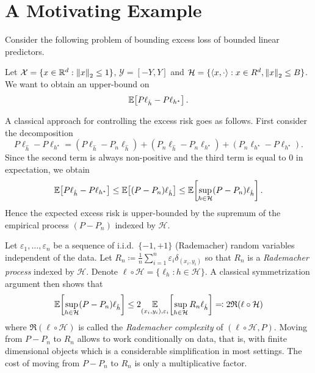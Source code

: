\documentclass[main.tex]{subfiles}
\begin{document}
\section{A Motivating Example}
\label{section:motivation}

Consider the following problem of bounding excess loss of bounded linear
predictors.
\begin{problem}
  \label{problem:linear-predictors}
  Let $\mathcal{X} = \{x \in \mathbb{R}^{d} : \left\lVert x \right\rVert_{2} \leq 1\}$,
  $\mathcal{Y} = [-Y, Y]$ and
  $\mathcal{H} = \{\left\langle {x}, {\cdot} \right\rangle : x \in R^{d}, \left\lVert x \right\rVert_{2} \leq B\}$.
  We want to obtain an upper-bound on
  $$
    \mathbb{E}\!\left[{
      P\ell_{\hat{h}} - P\ell_{h^{\star}}
    }\right].
  $$
\end{problem}

A classical approach for controlling the excess risk goes as follows.
First consider the decomposition
\begin{equation}
  P\ell_{\hat{h}} - P\ell_{h^{\star}}
  =
  (P\ell_{\hat{h}}
  - P_{n}\ell_{\hat{h}})
  + (P_{n}{\ell_{\hat{h}}}
  - P_{n}{\ell_{h^{\star}}})
  + (P_{n}{\ell_{h^{\star}}}
  - P\ell_{h^{\star}}).
  \label{eq:excess-risk-decomposition}
\end{equation}
Since the second term is always non-positive and the third term is equal to
$0$ in expectation, we obtain
$$
  \mathbb{E}\!\left[{P\ell_{\hat{h}} - P\ell_{h^{\star}}}\right]
  \leq
  \mathbb{E}\!\left[{(P-P_{n})\ell_{\hat{h}}}\right]
  \leq
  \mathbb{E}\!\left[{\sup_{h \in \mathcal{H}} (P-P_{n})\ell_{\hat{h}}}\right].
$$
Hence the expected excess risk is upper-bounded by the supremum of
the empirical process $(P - P_{n})$ indexed by $\mathcal{H}$.

Let $\varepsilon_{1}, \dots, \varepsilon_{n}$ be a sequence of i.i.d.\
$\{-1, +1\}$ (Rademacher) random variables independent of the data.
Let $R_{n} \coloneqq \frac{1}{n} \sum_{i=1}^{n} \varepsilon_{i}\delta_{(x_{i},
y_{i})}$ so that $R_{n}$ is a \emph{Rademacher process} indexed
by $\mathcal{H}$.
Denote $\ell \circ \mathcal{H} = \{ \ell_{h} : h \in \mathcal{H} \}$.
A classical symmetrization argument then shows that
$$
  \mathbb{E}\!\left[{\sup_{h \in \mathcal{H}} (P-P_{n})\ell_{\hat{h}}}\right]
  \leq
  2 \underset{{(x_{i}, y_{i}), \varepsilon_{i}}}{\mathbb{E}}\!\left[{\sup_{h \in \mathcal{H}} R_{n}\ell_{\hat{h}}}\right]
 \eqqcolon 2 \mathfrak{R}(\ell \circ \mathcal{H})
$$
where $\mathfrak{R}(\mathcal{\ell \circ H})$ is called the
\emph{Rademacher complexity} of $(\ell \circ \mathcal{H}, P)$.
Moving from $P - P_{n}$ to $R_{n}$ allows to work conditionally on data, that
is, with finite dimensional objects which is a considerable simplification in
most settings. The cost of moving from $P - P_{n}$ to $R_{n}$ is only a
multiplicative factor.
\end{document}
